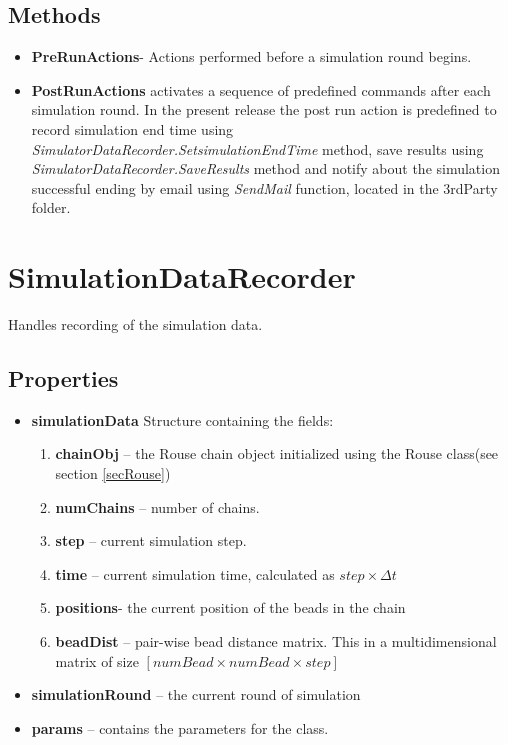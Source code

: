 \documentclass[12pt]{report}
\begin{document}
\subsection{Methods}
\begin{itemize}
\item{\textbf{PreRunActions}}- Actions performed before a simulation round begins. 

\item{\textbf{PostRunActions}} activates a sequence of predefined commands after each simulation round. In the present release the post run action is predefined to record simulation end time using \textit{SimulatorDataRecorder.SetsimulationEndTime} method, save results using \textit{SimulatorDataRecorder.SaveResults} method and notify about the simulation successful ending by email using \textit{SendMail} function, located in the 3rdParty folder.
\end{itemize}

\section{SimulationDataRecorder}\label{secSimulatorDataRecorder}
Handles recording of the simulation data.
\subsection{Properties}
\begin{itemize}
\item{\textbf{simulationData}
 Structure containing the fields:
\begin{enumerate}
\item{\textbf{chainObj}} – the Rouse chain object initialized using the Rouse class(see section \ref{secRouse})
\item{\textbf{numChains}} – number of chains.
\item{\textbf{step}} – current simulation step.
\item{\textbf{time}} – current simulation time, calculated as $step\times\Delta t$
\item{\textbf{positions}}- the current position of the beads in the chain
\item{\textbf{beadDist}} – pair-wise bead distance matrix. This in a multidimensional matrix of size $[numBead \times
numBead \times step]$
\end{enumerate}}

\item{\textbf{simulationRound}} – the current round of simulation
\item{\textbf{params}} – contains the parameters for the class.
\end{itemize}
\end{document}
